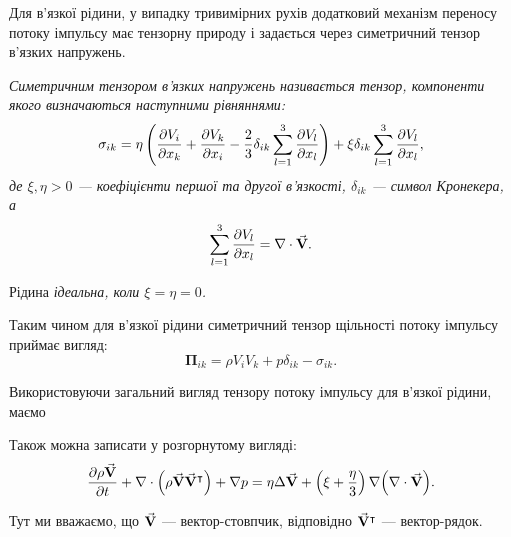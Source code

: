 Для в'язкої рідини, у випадку тривимірних рухів додатковий механізм переносу потоку імпульсу має тензорну природу і задається через симетричний тензор в'язких напружень.

\begin{definition}
	\it{Симетричним тензором в'язких напружень} називається тензор, компоненти якого визначаються наступними рівняннями: 
	\begin{equation}
		\sigma_{ik} = \eta \left( \frac{\partial V_i}{\partial x_k} + \frac{\partial V_k}{\partial x_i} - \frac{2}{3} \delta_{ik} \displaystyle\sum\limits_{l = 1}^3 \frac{\partial V_l}{\partial x_l}\right) + \xi \delta_{ik} \displaystyle\sum\limits_{l = 1}^3 \frac{\partial V_l}{\partial x_l},
	\end{equation}
	де $\xi, \eta > 0$ --- коефіцієнти першої та другої в'язкості, $\delta_{ik}$ --- символ Кронекера, а
	\begin{equation}
		\displaystyle\sum\limits_{l = 1}^3 \frac{\partial V_l}{\partial x_l} = \nabla \cdot {\vec{\mathbf{V}}}.
	\end{equation}
\end{definition}

\begin{remark}
	Рідина \it{ідеальна}, коли $\xi = \eta = 0$.
\end{remark}

Таким чином для в'язкої рідини симетричний тензор щільності потоку імпульсу приймає вигляд:
\begin{equation}
	\bm{\Pi}_{ik} = \rho V_i V_k + p \delta_{ik} - \sigma_{ik}.
\end{equation}

Використовуючи загальний вигляд тензору потоку імпульсу для в'язкої рідини, маємо
\begin{law}
	\label{law:impulse-conservation-viscous-liquid}
	Також можна записати у розгорнутому вигляді:
	\begin{equation}
		\label{eq:impulse-conservation-viscous-liquid}
		\frac{\partial \rho {\vec{\mathbf{V}}}}{\partial t} + \nabla \cdot \Big(\rho {\vec{\mathbf{V}}} {\vec{\mathbf{V}}}^\intercal\Big) + \nabla p = \eta \Delta {\vec{\mathbf{V}}} + \left( \xi + \frac{\eta}{3} \right) \nabla \Big(\nabla \cdot {\vec{\mathbf{V}}} \Big).
	\end{equation}
\end{law}

\begin{remark}
	Тут ми вважаємо, що ${\vec{\mathbf{V}}}$ --- вектор-стовпчик, відповідно   ${\vec{\mathbf{V}}}^\intercal $ --- вектор-рядок.
\end{remark}

